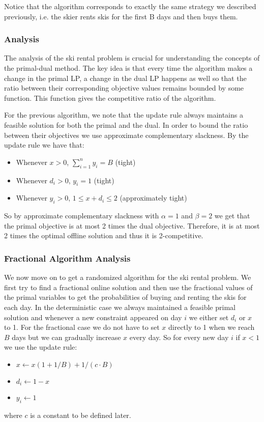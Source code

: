 Notice that the algorithm corresponds to exactly the same strategy we described previously, i.e. the skier rents skis for the first B days and then buys them.

\subsubsection{Analysis}

The analysis of the ski rental problem is crucial for understanding the concepts of the primal-dual method. 
The key idea is that every time the algorithm makes a change in the primal LP, a change in the dual LP happens as well so that the ratio between their corresponding objective values remains bounded by some function. 
This function gives the competitive ratio of the algorithm.

For the previous algorithm, we note that the update rule always maintains a feasible solution for both the primal and the dual. 
In order to bound the ratio between their objectives we use approximate complementary slackness. 
By the update rule we have that:
\begin{itemize}
\item Whenever $x > 0$, $\sum^n_{i=1} y_i = B$ (tight)
\item Whenever $d_i > 0$, $y_i = 1$ (tight)
\item Whenever $y_i > 0$, $1 \le x+d_i \le 2$ (approximately tight)
\end{itemize}

So by approximate complementary slackness with $\alpha = 1$ and $\beta = 2$ we get that the primal objective is at most 2 times the dual objective. Therefore, it is at most 2 times the optimal offline solution and thus it is 2-competitive.

\subsubsection{Fractional Algorithm Analysis}
We now move on to get a randomized algorithm for the ski rental problem. 
We first try to find a fractional online solution and then use the fractional values of the primal variables to get the probabilities of buying and renting the skis for each day.
In the deterministic case we always maintained a feasible primal solution and whenever a new constraint appeared on day $i$ we either set $d_i$ or $x$ to 1. For the fractional case we do not have to set $x$ directly to 1 when we reach $B$ days but we can gradually increase $x$ every day. So for every new day $i$ if $x<1$ we use the update rule:
\begin{itemize}
\item $x \leftarrow x(1+1/B) + 1/(c\cdot B)$
\item $d_i \leftarrow 1 - x$
\item $y_i \leftarrow 1$
\end{itemize}
where $c$ is a constant to be defined later.

